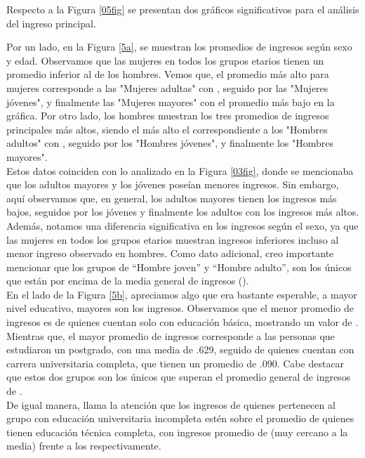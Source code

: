 \documentclass{article}
\begin{document}
	\FloatBarrier
	
	Respecto a la Figura \ref{05fig} se presentan dos gráficos significativos para el análisis del ingreso principal.
	
	Por un lado, en la Figura \ref{5a}, se muestran los promedios de ingresos según sexo y edad. Observamos que las mujeres en todos los grupos etarios tienen un promedio inferior al de los hombres. Vemos que, el promedio más alto para mujeres corresponde a las "Mujeres adultas" con , seguido por las "Mujeres jóvenes", y finalmente las "Mujeres mayores" con el promedio más bajo en la gráfica. Por otro lado, los hombres muestran los tres promedios de ingresos principales más altos, siendo el más alto el correspondiente a los "Hombres adultos" con , seguido por los "Hombres jóvenes", y finalmente los "Hombres mayores".\\
	
	Estos datos coinciden con lo analizado en la Figura \ref{03fig}, donde se mencionaba que los adultos mayores y los jóvenes poseían menores ingresos. Sin embargo, aquí observamos que, en general, los adultos mayores tienen los ingresos más bajos, seguidos por los jóvenes y finalmente los adultos con los ingresos más altos. Además, notamos una diferencia significativa en los ingresos según el sexo, ya que las mujeres en todos los grupos etarios muestran ingresos inferiores incluso al menor ingreso observado en hombres. Como dato adicional, creo importante mencionar que los grupos de “Hombre joven” y “Hombre adulto”, son los únicos que están por encima de la media general de ingresos ().\\
	
	En el lado de la Figura \ref{5b}, apreciamos algo que era bastante esperable, a mayor nivel educativo, mayores son los ingresos. Observamos que el menor promedio de ingresos es de quienes cuentan solo con educación básica, mostrando un valor de . Mientras que, el mayor promedio de ingresos corresponde a las personas que estudiaron un postgrado, con una media de .629, seguido de quienes cuentan con carrera universitaria completa, que tienen un promedio de .090. Cabe destacar que estos dos grupos son los únicos que superan el promedio general de ingresos de .\\
	
	De igual manera, llama la atención que los ingresos de quienes pertenecen al grupo con educación universitaria incompleta estén sobre el promedio de quienes tienen educación técnica completa, con ingresos promedio de  (muy cercano a la media) frente a los  respectivamente.\\
	
\end{document}
